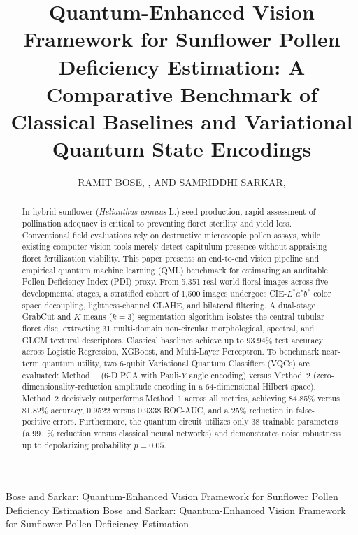 \documentclass{ieeeaccess}
\begin{document}

\title{Quantum-Enhanced Vision Framework for Sunflower Pollen Deficiency Estimation: A Comparative Benchmark of Classical Baselines and Variational Quantum State Encodings}

\author{\uppercase{Ramit Bose}, , AND \uppercase{Samriddhi Sarkar}, }

\address[1]{Department of Computer Science and Engineering, School of Computer Science and Engineering, Vellore Institute of Technology, Vellore 632014, Tamil Nadu, India (e-mail: ramit.bose2024@vitstudent.ac.in, samriddhi.sarkar@vit.ac.in)}


\markboth
{Bose and Sarkar: Quantum-Enhanced Vision Framework for Sunflower Pollen Deficiency Estimation}
{Bose and Sarkar: Quantum-Enhanced Vision Framework for Sunflower Pollen Deficiency Estimation}


\begin{abstract}
In hybrid sunflower (\textit{Helianthus annuus} L.) seed production, rapid assessment of pollination adequacy is critical to preventing floret sterility and yield loss. Conventional field evaluations rely on destructive microscopic pollen assays, while existing computer vision tools merely detect capitulum presence without appraising floret fertilization viability. This paper presents an end-to-end vision pipeline and empirical quantum machine learning (QML) benchmark for estimating an auditable Pollen Deficiency Index (PDI) proxy. From 5,351 real-world floral images across five developmental stages, a stratified cohort of 1,500 images undergoes CIE-$L^*a^*b^*$ color space decoupling, lightness-channel CLAHE, and bilateral filtering. A dual-stage GrabCut and $K$-means ($k=3$) segmentation algorithm isolates the central tubular floret disc, extracting 31 multi-domain non-circular morphological, spectral, and GLCM textural descriptors. Classical baselines achieve up to 93.94\% test accuracy across Logistic Regression, XGBoost, and Multi-Layer Perceptron. To benchmark near-term quantum utility, two 6-qubit Variational Quantum Classifiers (VQCs) are evaluated: Method~1 (6-D PCA with Pauli-$Y$ angle encoding) versus Method~2 (zero-dimensionality-reduction amplitude encoding in a 64-dimensional Hilbert space). Method~2 decisively outperforms Method~1 across all metrics, achieving 84.85\% versus 81.82\% accuracy, 0.9522 versus 0.9338 ROC-AUC, and a 25\% reduction in false-positive errors. Furthermore, the quantum circuit utilizes only 38 trainable parameters (a 99.1\% reduction versus classical neural networks) and demonstrates noise robustness up to depolarizing probability $p = 0.05$.
\end{abstract}
\end{document}
